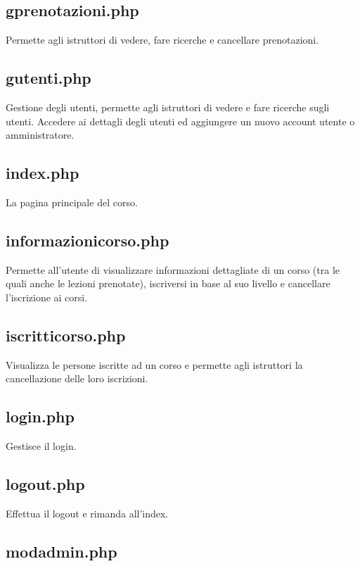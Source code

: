 \subsection{gprenotazioni.php}

Permette agli istruttori di vedere, fare ricerche e cancellare prenotazioni.

\subsection{gutenti.php}

Gestione degli utenti, permette agli istruttori di vedere e fare ricerche sugli utenti. Accedere ai dettagli degli utenti ed aggiungere un nuovo account utente o amministratore. 

\subsection{index.php}

La pagina principale del corso.

\subsection{informazionicorso.php}

Permette all'utente di visualizzare informazioni dettagliate di un corso (tra le quali anche le lezioni prenotate), iscriversi in base al suo livello e cancellare l'iscrizione ai corsi.

\subsection{iscritticorso.php}

Visualizza le persone iscritte ad un corso e permette agli istruttori la cancellazione delle loro iscrizioni.

\subsection{login.php}

Gestisce il login.

\subsection{logout.php}

Effettua il logout e rimanda all'index.

\subsection{modadmin.php}

